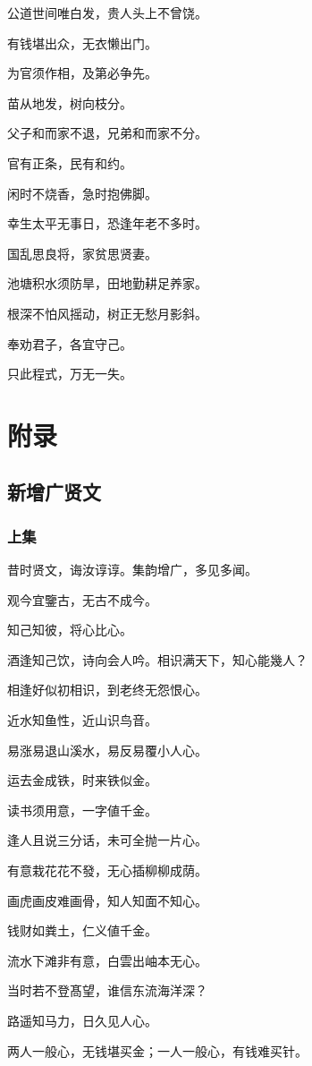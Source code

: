 \documentclass[12pt,oneside]{book}
\begin{document}
公道世间唯白发，贵人头上不曾饶。

有钱堪出众，无衣懒出门。

为官须作相，及第必争先。

苗从地发，树向枝分。

父子和而家不退，兄弟和而家不分。

官有正条，民有和约。

闲时不烧香，急时抱佛脚。

幸生太平无事日，恐逢年老不多时。

国乱思良将，家贫思贤妻。

池塘积水须防旱，田地勤耕足养家。

根深不怕风摇动，树正无愁月影斜。

奉劝君子，各宜守己。

只此程式，万无一失。  
  
\part{附录}
\chapter{新增广贤文}
\section{上集}
昔时贤文，诲汝谆谆。集韵增广，多见多闻。

观今宜鑒古，无古不成今。

知己知彼，将心比心。

酒逢知己饮，诗向会人吟。相识满天下，知心能幾人？

相逢好似初相识，到老终无怨恨心。

近水知鱼性，近山识鸟音。

易涨易退山溪水，易反易覆小人心。

运去金成铁，时来铁似金。

读书须用意，一字値千金。

逢人且说三分话，未可全抛一片心。

有意栽花花不發，无心插柳柳成荫。

画虎画皮难画骨，知人知面不知心。

钱财如粪土，仁义値千金。

流水下滩非有意，白雲出岫本无心。

当时若不登髙望，谁信东流海洋深？

路遥知马力，日久见人心。

两人一般心，无钱堪买金；一人一般心，有钱难买针。
\end{document}
